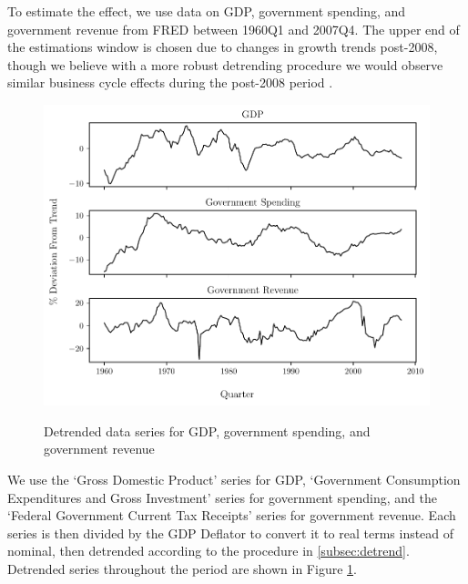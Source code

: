 To estimate the effect, we use data on GDP, government spending, and government revenue from FRED between 1960Q1 and 2007Q4. The upper end of the estimations window is chosen due to changes in growth trends post-2008, though we believe with a more robust detrending procedure we would observe similar business cycle effects during the post-2008 period \parencite{benigno2018stagnation}.

\begin{figure}[t!]
    \centering
    \caption{Detrended data series for GDP, government spending, and government revenue}
    \includegraphics{figures/detrended_data.pdf}
    \label{fig:dta}
\end{figure}

We use the `Gross Domestic Product' series for GDP, `Government Consumption Expenditures and Gross Investment' series for government spending, and the `Federal Government Current Tax Receipts' series for government revenue. Each series is then divided by the GDP Deflator to convert it to real terms instead of nominal, then detrended according to the procedure in \ref{subsec:detrend}. Detrended series throughout the period are shown in Figure \ref{fig:dta}.
